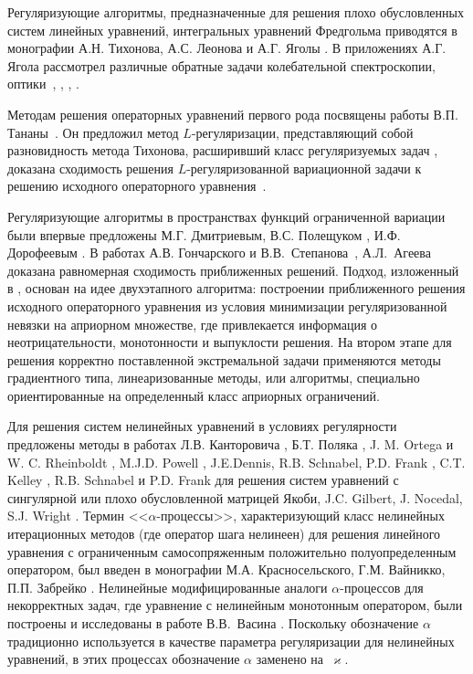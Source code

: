 {Регуляризующие алгоритмы, предназначенные для решения плохо обусловленных систем линейных уравнений, интегральных уравнений Фредгольма приводятся в монографии А.Н. Тихонова, А.С. Леонова и А.Г. Яголы \cite{TihLeoYag2017}. В приложениях А.Г. Ягола рассмотрел различные обратные задачи колебательной спектроскопии, оптики~\cite{KliKosLiYag2016}, \cite{IsaLukTihYag2017}, \cite{KocKurPenYag2017}, \cite{LukYag2016}.

Методам решения операторных уравнений первого рода посвящены работы В.П. Тананы~\cite{Tan1977, Tan1997, Tan1981}. Он предложил метод $L$-регуляризации, представляющий собой разновидность метода Тихонова, расширивший класс регуляризуемых задач \cite{Tan2003_1,Tan2003_2}, доказана сходимость решения $L$-регуляризованной вариационной задачи к решению исходного операторного уравнения~\cite{Tan2003_2}.

Регуляризующие алгоритмы в пространствах функций ограниченной вариации были впервые предложены М.Г. Дмитриевым, В.С. Полещуком \cite{DmiPol1972}, И.Ф. Дорофеевым \cite{Dor1979}. В работах А.В. Гончарского и В.В.~Степанова~\cite{GonSte1979}, А.Л.~Агеева~\cite{Ag1980} доказана равномерная сходимость приближенных решений. Подход, изложенный в \cite{TikhGonSteYag1990}, основан на идее двухэтапного алгоритма: построении приближенного решения  исходного операторного уравнения из условия минимизации регуляризованной невязки на априорном множестве, где привлекается информация о неотрицательности, монотонности и выпуклости решения. 
На втором этапе для решения корректно поставленной экстремальной задачи применяются методы градиентного типа, линеаризованные методы, или алгоритмы, специально ориентированные на определенный класс априорных ограничений.

Для решения систем нелинейных уравнений в условиях регулярности предложены методы в работах Л.В. Канторовича \cite{Kan1947}, Б.Т. Поляка \cite{Pol1969}, J. M. Ortega и W. C. Rheinboldt \cite{OrtRhe1970}, M.J.D. Powell \cite{Pow1970}, J.E.Dennis, R.B. Schnabel, P.D. Frank \cite{DenSchn1996}, C.T. Kelley \cite{Kel1995}, R.B. Schnabel и P.D. Frank \cite{SchnFra1983} для решения систем уравнений с сингулярной или плохо обусловленной матрицей Якоби, J.C. Gilbert, J. Nocedal, S.J. Wright \cite{GilNoc1991, NocWri2006}. Термин <<$\alpha$-процессы>>, характеризующий класс нелинейных итерационных методов (где оператор шага нелинеен) для решения линейного уравнения с ограниченным самосопряженным положительно полуопределенным оператором, был введен в монографии М.А. Красносельского, Г.М. Вайникко, П.П. Забрейко \cite{KraVayZab1969}. %
Нелинейные модифицированные аналоги $\alpha$-процессов для некорректных задач, где уравнение с нелинейным монотонным оператором, были построены и исследованы в работе В.В.~Васина \cite{Vasin2016}. Поскольку обозначение $\alpha$ традиционно используется в качестве параметра регуляризации для нелинейных уравнений, в этих процессах обозначение $\alpha$ заменено на~$\varkappa$.

}
